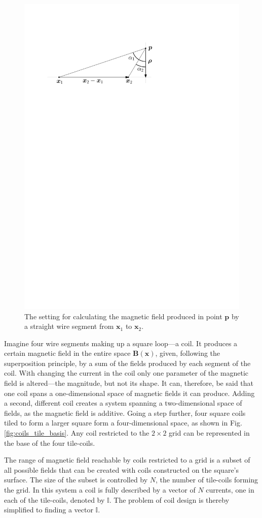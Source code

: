 \begin{figure}
  \centering
  \includegraphics[width=0.6\linewidth]{gfx/coils/biot_savart.pdf}
  \caption{The setting for calculating the magnetic field produced in point $\mathbf{p}$ by a straight wire segment from $\mathbf{x}_1$ to $\mathbf{x}_2$.}\label{fig:biot-savart}
\end{figure}

Imagine four wire segments making up a square loop---a coil. It produces a certain magnetic field in the entire space $\mathbf{B}(\mathbf{x})$, given, following the superposition principle, by a sum of the fields produced by each segment of the coil.
With changing the current in the coil only one parameter of the magnetic field is altered---the magnitude, but not its shape. It can, therefore, be said that one coil spans a one-dimensional space of magnetic fields it can produce. Adding a second, different coil creates a system spanning a two-dimensional space of fields, as the magnetic field is additive. Going a step further, four square coils tiled to form a larger square form a four-dimensional space, as shown in Fig.\,\ref{fig:coils_tile_basis}. Any coil restricted to the $2 \times 2$ grid can be represented in the base of the four tile-coils.

The range of magnetic field reachable by coils restricted to a grid is a subset of all possible fields that can be created with coils constructed on the square's surface. The size of the subset is controlled by $N$, the number of tile-coils forming the grid.
In this system a coil is fully described by a vector of $N$ currents, one in each of the tile-coils, denoted by $\mathbb{I}$. The problem of coil design is thereby simplified to finding a vector $\mathbb{I}$.


